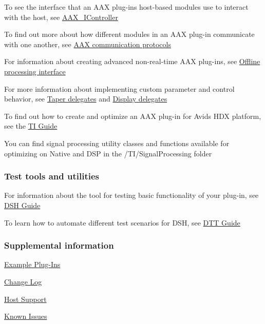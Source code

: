 \begin{DoxyItemize}
\item To see the interface that an A\+A\+X plug-\/in\textquotesingle{}s host-\/based modules use to interact with the host, see \hyperlink{a00090}{A\+A\+X\+\_\+\+I\+Controller} \item To find out more about how different modules in an A\+A\+X plug-\/in communicate with one another, see \hyperlink{a00330}{A\+A\+X communication protocols} \item For information about creating advanced non-\/real-\/time A\+A\+X plug-\/ins, see \hyperlink{a00334}{Offline processing interface} \item For more information about implementing custom parameter and control behavior, see \hyperlink{a00345}{Taper delegates} and \hyperlink{a00346}{Display delegates} \item To find out how to create and optimize an A\+A\+X plug-\/in for Avid\textquotesingle{}s H\+D\+X platform, see the \hyperlink{a00362}{T\+I Guide} \item You can find signal processing utility classes and functions available for optimizing on Native and D\+S\+P in the /\+T\+I/\+Signal\+Processing folder\end{DoxyItemize}
\hypertarget{a00323_welcome_testtools}{}\subsubsection{Test tools and utilities}\label{a00323_welcome_testtools}
\begin{DoxyItemize}
\item For information about the tool for testing basic functionality of your plug-\/in, see \hyperlink{a00365}{D\+S\+H Guide} \item To learn how to automate different test scenarios for D\+S\+H, see \hyperlink{a00366}{D\+T\+T Guide}\end{DoxyItemize}
\hypertarget{a00323_welcome_supplemental}{}\subsubsection{Supplemental information}\label{a00323_welcome_supplemental}
\begin{DoxyItemize}
\item \hyperlink{a00376}{Example Plug-\/\+Ins} \item \hyperlink{a00375}{Change Log} \item \hyperlink{a00373}{Host Support} \item \hyperlink{a00374}{Known Issues}\end{DoxyItemize}
